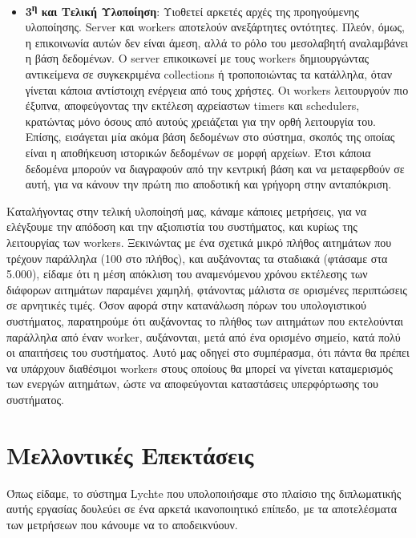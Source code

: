 \begin{itemize}
	\item \textbf{3\textsuperscript{η} και Tελική Υλοποίηση}: Υιοθετεί αρκετές αρχές της προηγούμενης υλοποίησης. Server και workers
		αποτελούν ανεξάρτητες οντότητες. Πλεόν, όμως, η επικοινωνία αυτών δεν είναι άμεση, αλλά το ρόλο του μεσολαβητή αναλαμβάνει η
		βάση δεδομένων. Ο server επικοικωνεί με τους workers δημιουργώντας αντικείμενα σε συγκεκριμένα collections ή τροποποιώντας τα κατάλληλα,
		όταν γίνεται κάποια αντίστοιχη ενέργεια από τους χρήστες. Οι workers λειτουργούν πιο έξυπνα, αποφεύγοντας την εκτέλεση αχρείαστων timers
		και schedulers, κρατώντας μόνο όσους από αυτούς χρειάζεται για την ορθή λειτουργία του. Επίσης, εισάγεται μία ακόμα βάση δεδομένων στο σύστημα,
		σκοπός της οποίας είναι η αποθήκευση ιστορικών δεδομένων σε μορφή αρχείων. Έτσι κάποια δεδομένα μπορούν να διαγραφούν από την κεντρική βάση και
		να μεταφερθούν σε αυτή, για να κάνουν την πρώτη πιο αποδοτική και γρήγορη στην ανταπόκριση. 
\end{itemize}

Καταλήγοντας στην τελική υλοποίησή μας, κάναμε κάποιες μετρήσεις, για να ελέγξουμε την απόδοση και την αξιοπιστία του συστήματος, και κυρίως της
λειτουργίας των workers. Ξεκινώντας με ένα σχετικά μικρό πλήθος αιτημάτων που τρέχουν παράλληλα (100 στο πλήθος), και αυξάνοντας
τα σταδιακά (φτάσαμε στα 5.000), είδαμε ότι η μέση απόκλιση του αναμενόμενου χρόνου εκτέλεσης των διάφορων αιτημάτων παραμένει χαμηλή, φτάνοντας μάλιστα
σε ορισμένες περιπτώσεις σε αρνητικές τιμές. Όσον αφορά στην κατανάλωση πόρων του υπολογιστικού συστήματος, παρατηρούμε ότι
αυξάνοντας το πλήθος των αιτημάτων που εκτελούνται παράλληλα από έναν worker, αυξάνονται, μετά από ένα ορισμένο σημείο, κατά πολύ οι απαιτήσεις του
συστήματος. Αυτό μας οδηγεί στο συμπέρασμα, ότι πάντα θα πρέπει να υπάρχουν διαθέσιμοι workers στους οποίους θα
μπορεί να γίνεται καταμερισμός των ενεργών αιτημάτων, ώστε να αποφεύγονται καταστάσεις υπερφόρτωσης του συστήματος.  


\section{Μελλοντικές Επεκτάσεις}
\label{section:future_stuff}

Όπως είδαμε, το σύστημα Lychte που υπολοποιήσαμε στο πλαίσιο της διπλωματικής αυτής
εργασίας δουλεύει σε ένα αρκετά ικανοποιητικό επίπεδο, με τα αποτελέσματα των μετρήσεων που κάνουμε να το αποδεικνύουν.

